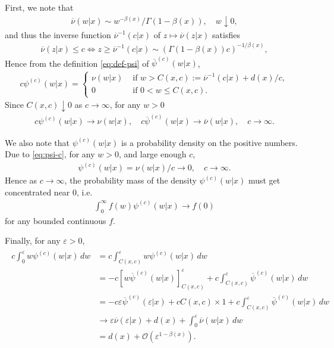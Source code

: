 \documentclass[a4paper,12pt]{elsarticle}
\numberwithin{equation}{section}
\theoremstyle{plain}
\theoremstyle{definition}
\theoremstyle{remark}
\numberwithin{equation}{section}
\newcommand{\1}{\mathbf 1}
\begin{document}
First, we note that 
\begin{align}
  \overline \nu(w|x) \sim w^{-\beta(x)} / \Gamma(1-\beta(x)), 
  \quad w \downarrow 0, 
\end{align}
and thus the inverse function ${\overline \nu}^{-1}(c|x)$ of 
$z \mapsto \overline \nu(z|x)$ satisfies
\begin{align}
  \overline \nu(z | x) \le c
  \Leftrightarrow z \ge {\overline \nu}^{-1}(c|x)
  \sim (\Gamma(1-\beta(x))c)^{-1/\beta(x)},
\end{align}
Hence from the definition \eqref{eq:def-psi} of $\overline \psi^{(c)}(w|x)$, 
\begin{align}
\label{eq:psi-c}
  c \psi^{(c)}(w|x) = \begin{cases}
  \nu(w | x) & \text{ if } w > C(x,c) 
  := {\overline \nu}^{-1}(c|x) + d(x)/c, 
  \\
  0 & \text{ if } 0 < w \le C(x,c). 
  \end{cases}
\end{align}
Since $C(x,c) \downarrow 0$ as $c \to \infty$, for any $w > 0$
\begin{align} \label{eq:non-local-psi}
c \psi^{(c)}(w|x) \to \nu(w|x),
\quad 
  c \overline \psi^{(c)}(w|x) \to \overline \nu(w|x), \quad c \to \infty. 
\end{align}

We also note that $\psi^{(c)}(w|x)$ is a probability density on the positive 
numbers.  Due to \eqref{eq:psi-c}, for any $w > 0$, and large enough $c$,
\begin{align}
  \psi^{(c)}(w|x) = \nu(w|x) / c \to 0, \quad c \to \infty. 
\end{align}  
Hence as $c \to \infty$, the probability mass of the density 
$\psi^{(c)}(w|x)$ must get concentrated near $0$, i.e.\ 
\begin{align} \label{eq:to-delta}
  \int_0^\infty f(w) \psi^{(c)}(w|x) \to f(0)
\end{align}
for any bounded continuous $f$.

Finally, for any $\varepsilon > 0$,
\begin{align}
\label{eq:local-psi}
\begin{split}
  c \int_0^\varepsilon w \psi^{(c)}(w|x) \,dw
  &= c \int_{C(x,c)}^\varepsilon w \psi^{(c)}(w|x) \,dw
  \\
  &= -c\left[w\overline \psi^{(c)}(w|x)\right]^\varepsilon_{C(x,c)}
  + c \int_{C(x,c)}^\varepsilon \overline \psi^{(c)}(w|x)\,dw
  \\
  &= -c\varepsilon \overline \psi^{(c)}(\varepsilon|x)
  + c C(x,c) \times 1
  + c \int_{C(x,c)}^\varepsilon \overline \psi^{(c)}(w|x)\,dw
  \\
  &\to \varepsilon \overline\nu(\varepsilon | x)
  + d(x) + \int_0^\varepsilon \overline \nu(w|x)\,dw
  \\
  &= d(x) + \mathcal O(\varepsilon^{1-\beta(x)}).
\end{split}
\end{align}
\end{document}
